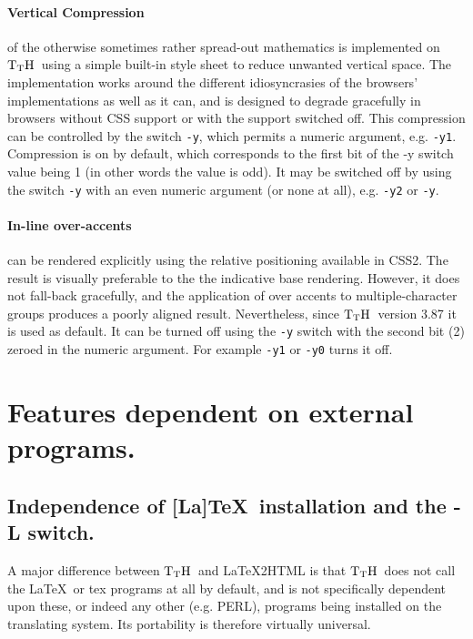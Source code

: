 \documentclass[12pt]{article}
\def\TtH{$\rm{}T_TH$}
\begin{document}
\paragraph{Vertical Compression} of the otherwise sometimes rather
spread-out mathematics is implemented on \TtH\ using a simple built-in
style sheet to reduce unwanted vertical space. The implementation
works around the different idiosyncrasies of the browsers'
implementations as well as it can, and is designed to degrade
gracefully in browsers without CSS support or with the support
switched off. This compression can be controlled by the switch \verb!-y!,
which permits a numeric argument, e.g. \verb!-y1!.  Compression is on
by default, which corresponds to the first bit of the -y switch value
being 1 (in other words the value is odd).  It may be switched off by
using the switch \verb!-y! with an even numeric argument (or none at
all), e.g. \verb!-y2! or \verb!-y!.

\paragraph{In-line over-accents} can be rendered explicitly using the
relative positioning available in CSS2. The result is visually
 preferable to the the indicative base rendering. However, it does not
 fall-back gracefully, and the application of over accents to
 multiple-character groups produces a poorly aligned result.
  Nevertheless, since \TtH\ version 3.87 it is used as default. It can
 be turned off using the \verb!-y!  switch with the second bit (2) zeroed
 in the numeric argument. For example \verb!-y1! or \verb!-y0! turns
 it off.


\section{Features dependent on external programs.}

\subsection{Independence of [La]\TeX\ installation and the -L switch.}
\label{LaTeXfiles}
 A major difference
between \TtH\ and LaTeX2HTML is that \TtH\ does not call the \LaTeX\
or tex programs at all by default, and is not specifically dependent
upon these, or indeed any other (e.g. PERL), programs being installed
on the translating system. Its portability is therefore virtually
universal.
\end{document}
